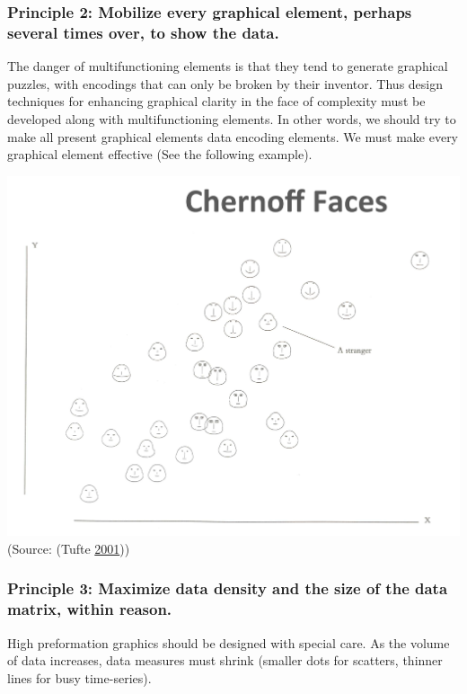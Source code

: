 \documentclass[]{book}
\theoremstyle{definition}
\theoremstyle{definition}
\theoremstyle{definition}
\theoremstyle{remark}
\begin{document}
\subsubsection{Principle 2: Mobilize every graphical element, perhaps
several times over, to show the
data.}\label{principle-2-mobilize-every-graphical-element-perhaps-several-times-over-to-show-the-data.}

The danger of multifunctioning elements is that they tend to generate
graphical puzzles, with encodings that can only be broken by their
inventor. Thus design techniques for enhancing graphical clarity in the
face of complexity must be developed along with multifunctioning
elements. In other words, we should try to make all present graphical
elements data encoding elements. We must make every graphical element
effective (See the following example).

\includegraphics{images/Tufte_figure6.png} (Source: (Tufte
\protect\hyperlink{ref-Tufte_2001}{2001}))

\subsubsection{Principle 3: Maximize data density and the size of the
data matrix, within
reason.}\label{principle-3-maximize-data-density-and-the-size-of-the-data-matrix-within-reason.}

High preformation graphics should be designed with special care. As the
volume of data increases, data measures must shrink (smaller dots for
scatters, thinner lines for busy time-series).
\end{document}
